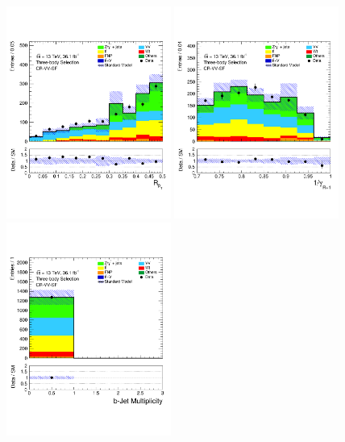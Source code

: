 \begin{figure}[!htb]
    \begin{center}
        \includegraphics[width=0.48\textwidth]{figures/search_stop2l/bkg_est/crvsf/crvSF_RPT}
        \includegraphics[width=0.48\textwidth]{figures/search_stop2l/bkg_est/crvsf/crvSF_gamInvRp1}
        \includegraphics[width=0.48\textwidth]{figures/search_stop2l/bkg_est/crvsf/crvSF_nBJets}

\end{center}
\end{figure}
